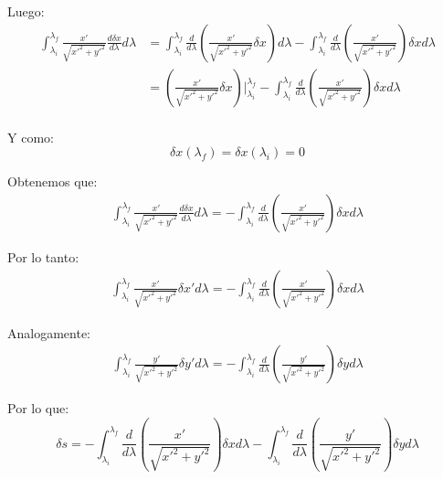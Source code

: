 \documentclass[paper=a4, fontsize=11pt,twoside]{scrartcl}
\begin{document}
Luego:
	\begin{align*}
		\int^{\lambda_{f}}_{\lambda_{i}}  \frac{x'}{\sqrt{ x'^{2} + y'^{2} }} \frac{d \delta x}{d\lambda} d\lambda 
		  &= \int^{\lambda_{f}}_{\lambda_{i}}  \frac{d}{d\lambda} \left( \frac{x'}{\sqrt{ x'^{2} + y'^{2} }} \delta x  \right) d\lambda
	   	  - \int^{\lambda_{f}}_{\lambda_{i}}  \frac{d}{d\lambda} \left( \frac{x'}{\sqrt{ x'^{2} + y'^{2} }}  \right) \delta x d\lambda \\
	   	  &= \left( \frac{x'}{\sqrt{ x'^{2} + y'^{2} }} \delta x \right) \Big|^{\lambda_{f}}_{\lambda_{i}} - \int^{\lambda_{f}}_{\lambda_{i}}  \frac{d}{d\lambda} \left( \frac{x'}{\sqrt{ x'^{2} + y'^{2} }}  \right) \delta x d\lambda \\
	\end{align*}

Y como:
	\begin{equation*}
		\delta x (\lambda_{f}) = \delta x (\lambda_{i}) = 0 
	\end{equation*}

Obtenemos que:
	\begin{align*}
		\int^{\lambda_{f}}_{\lambda_{i}}  \frac{x'}{\sqrt{ x'^{2} + y'^{2} }} \frac{d \delta x}{d\lambda} d\lambda = - \int^{\lambda_{f}}_{\lambda_{i}}  \frac{d}{d\lambda} \left( \frac{x'}{\sqrt{ x'^{2} + y'^{2} }}  \right) \delta x d\lambda 
	\end{align*}

Por lo tanto:
	\begin{align*}
		\int^{\lambda_{f}}_{\lambda_{i}}  \frac{x'}{\sqrt{ x'^{2} + y'^{2} }} \delta x' d\lambda = - \int^{\lambda_{f}}_{\lambda_{i}}  \frac{d}{d\lambda} \left( \frac{x'}{\sqrt{ x'^{2} + y'^{2} }}  \right) \delta x d\lambda 
	\end{align*}
	
Analogamente:
	\begin{align*}
		\int^{\lambda_{f}}_{\lambda_{i}}  \frac{y'}{\sqrt{ x'^{2} + y'^{2} }} \delta y' d\lambda = - \int^{\lambda_{f}}_{\lambda_{i}}  \frac{d}{d\lambda} \left( \frac{y'}{\sqrt{ x'^{2} + y'^{2} }}  \right) \delta y d\lambda 
	\end{align*}

Por lo que:
	\begin{equation*}
		\delta s = - \int^{\lambda_{f}}_{\lambda_{i}}  \frac{d}{d\lambda} \left( \frac{x'}{\sqrt{ x'^{2} + y'^{2} }}  \right) \delta x d\lambda  - \int^{\lambda_{f}}_{\lambda_{i}}  \frac{d}{d\lambda} \left( \frac{y'}{\sqrt{ x'^{2} + y'^{2} }}  \right) \delta y d\lambda 
	\end{equation*}	
\end{document}
